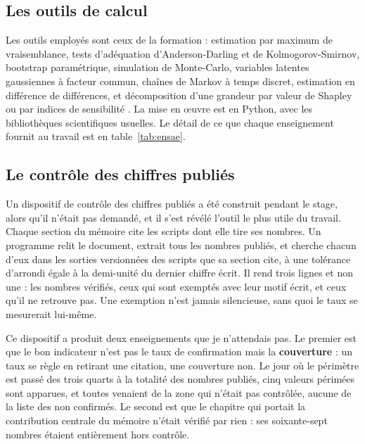 \documentclass[12pt,a4paper]{article}
\theoremstyle{definition}
\begin{document}
\subsection{Les outils de calcul}
\label{ss:outils}

Les outils employés sont ceux de la formation : estimation par maximum de
vraisemblance, tests d'adéquation d'Anderson-Darling et de Kolmogorov-Smirnov,
bootstrap paramétrique, simulation de Monte-Carlo, variables latentes gaussiennes
à facteur commun, chaînes de Markov à temps discret, estimation en différence de
différences, et décomposition d'une grandeur par valeur de Shapley
\citep{Shapley1953} ou par indices de sensibilité \citep{IoossPrieur2019}. La mise
en \oe{}uvre est en Python, avec les bibliothèques scientifiques usuelles. Le détail
de ce que chaque enseignement fournit au travail est en table~\ref{tab:ensae}.

\subsection{Le contrôle des chiffres publiés}
\label{ss:controle}


Un dispositif de contrôle des chiffres publiés a été construit pendant le stage,
alors qu'il n'était pas demandé, et il s'est révélé l'outil le plus utile du
travail. Chaque section du
mémoire cite les scripts dont elle tire ses nombres. Un programme relit le
document, extrait tous les nombres publiés, et cherche chacun d'eux dans les
sorties versionnées des scripts que sa section cite, à une tolérance d'arrondi
égale à la demi-unité du dernier chiffre écrit. Il rend trois lignes et non une :
les nombres vérifiés, ceux qui sont exemptés avec leur motif écrit, et ceux qu'il
ne retrouve pas. Une exemption n'est jamais silencieuse, sans quoi le taux se
mesurerait lui-même.

Ce dispositif a produit deux enseignements que je n'attendais pas. Le premier est
que le bon indicateur n'est pas le taux de confirmation mais la
\textbf{couverture} : un taux se règle en retirant une citation, une couverture
non. Le jour où le périmètre est passé des trois quarts à la totalité des nombres
publiés, cinq valeurs périmées sont apparues, et toutes venaient de la zone qui
n'était pas contrôlée, aucune de la liste des non confirmés. Le second est que le
chapitre qui portait la contribution centrale du mémoire n'était vérifié par
rien : ses soixante-sept nombres étaient entièrement hors contrôle.
\end{document}
